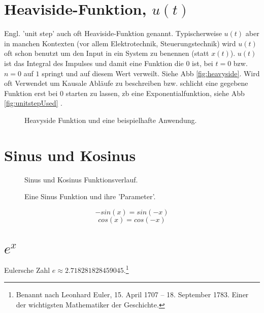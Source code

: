 \section{Heaviside-Funktion, $u(t)$}

Engl. 'unit step' auch oft Heaviside-Funktion genannt. Typischerweise $u(t)$ aber in manchen Kontexten (vor allem Elektrotechnik, Steuerungstechnik) wird $u(t)$ oft schon benutzt um den Input in ein System zu benennen (statt $x(t)$). $u(t)$ ist das Integral des Impulses und damit eine Funktion die $0$ ist, bei $t=0$ bzw. $n=0$ auf $1$ springt und auf diesem Wert verweilt. Siehe Abb \ref{fig:heavyside}. Wird oft Verwendet um Kausale Abläufe zu beschreiben bzw. schlicht eine gegebene Funktion erst bei 0 starten zu lassen, zb eine Exponentialfunktion, siehe Abb \ref{fig:unitstepUsed} .



\begin{figure}[H]
    \centering
    \subfigure[Einheitsschrittfunktion]{
        
        \label{fig:heavyside}
    }
    \hfill
    \caption{Heavyside Funktion und eine beispielhafte Anwendung.}
    \label{fig:unitStepComparison}
\end{figure}

\section{Sinus und Kosinus}
\begin{figure}[H]
	\centering
	
	\caption{Sinus und Kosinus Funktionsverlauf.}
	\label{fig:sincos}
\end{figure}


\begin{figure}[H]
	\centering
	
	\caption{Eine Sinus Funktion und ihre 'Parameter'.}
	\label{fig:sinParams}
\end{figure}


\begin{equation}
-sin(x) = sin(-x)
\end{equation}
\begin{equation}
cos(x) = cos(-x)
\end{equation}

\section{$e^x$}
Eulersche Zahl $e \approx 2.718281828459045$.\footnote{Benannt nach Leonhard Euler, 15. April 1707 – 18. September 1783. Einer der wichtigsten Mathematiker der Geschichte. }

